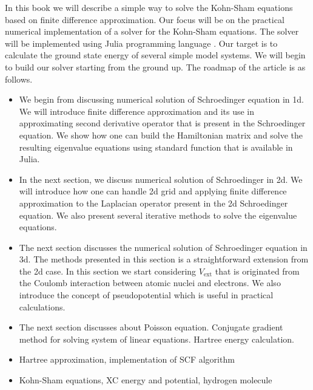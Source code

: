 In this book we will describe a simple way to solve the Kohn-Sham equations based on
finite difference approximation.
Our focus will be on the practical numerical implementation
of a solver for the Kohn-Sham equations.
The solver will be implemented using Julia programming language \cite{juliaorg}.
Our target is to calculate the ground state energy
of several simple model systems. We will begin to build our solver starting from the ground up.
The roadmap of the article is as follows.
\begin{itemize}
\item We begin from discussing numerical solution of Schroedinger equation in 1d.
  We will introduce finite difference approximation and its use in
  approximating second derivative operator that is present in the Schroedinger equation.
  We show how one can build the Hamiltonian matrix and
  solve the resulting eigenvalue equations using standard function that is available in Julia.
\item In the next section, we discuss numerical solution of Schroedinger in 2d. We will introduce
  how one can handle 2d grid and applying finite difference approximation to the Laplacian
  operator present in the 2d Schroedinger equation. We also present several iterative methods
  to solve the eigenvalue equations.
\item The next section discusses the numerical solution of Schroedinger equation in 3d. The methods
  presented in this section is a straightforward extension from the 2d case.
  In this section we start considering $V_{\mathrm{ext}}$ that is originated from the
  Coulomb interaction between atomic nuclei and electrons. We also introduce the concept of
  pseudopotential which is useful in practical calculations.
\item The next section discusses about Poisson equation. Conjugate gradient method for
  solving system of linear equations. Hartree energy calculation.
\item Hartree approximation, implementation of SCF algorithm
\item Kohn-Sham equations, XC energy and potential, hydrogen molecule
\end{itemize}
